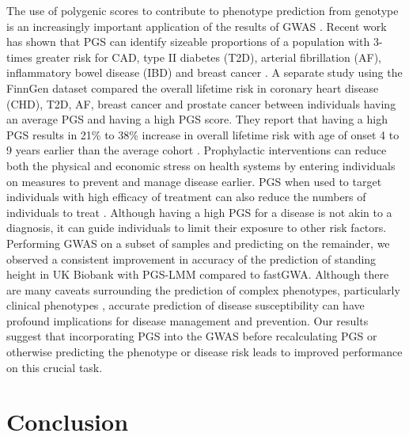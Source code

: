\documentclass[doublespacing]{bmcart}
\begin{document}

The use of polygenic scores to contribute to phenotype prediction from genotype is an increasingly important application of the results of GWAS \cite{martin2019predicting}. Recent work has shown that PGS can identify sizeable proportions of a population with 3-times greater risk for CAD, type II diabetes (T2D), arterial fibrillation (AF), inflammatory bowel disease (IBD) and breast cancer \cite{khera2018genome}. A separate study using the FinnGen dataset compared the overall lifetime risk in coronary heart disease (CHD), T2D, AF, breast cancer and prostate cancer between individuals having an average PGS and having a high PGS score. They report that having a high PGS results in 21\% to 38\% increase in overall lifetime risk with age of onset 4 to 9 years earlier than the average cohort \cite{mars2020polygenic}. Prophylactic interventions can reduce both the physical and economic stress on health systems by entering individuals on measures to prevent and manage disease earlier. PGS when used to target individuals with high efficacy of treatment can also reduce the numbers of individuals to treat \cite{gibson2019utilization}. Although having a high PGS for a disease is not akin to a diagnosis, it can guide individuals to limit their exposure to other risk factors. Performing GWAS on a subset of samples and predicting on the remainder, we observed a consistent improvement in accuracy of the prediction of standing height in UK Biobank with PGS-LMM compared to fastGWA. Although there are many caveats surrounding the prediction of complex phenotypes, particularly clinical phenotypes \cite{duncan2019analysis}, accurate prediction of disease susceptibility can have profound implications for disease management and prevention. Our results suggest that incorporating PGS into the GWAS before recalculating PGS or otherwise predicting the phenotype or disease risk leads to improved performance on this crucial task.


\section*{Conclusion}
\end{document}

